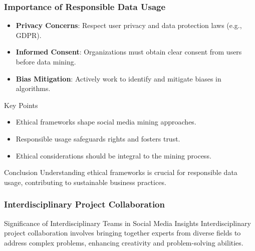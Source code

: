 \documentclass{beamer}
\begin{document}
\begin{frame}[fragile]
    \frametitle{Importance of Responsible Data Usage}
    \begin{itemize}
        \item \textbf{Privacy Concerns}: Respect user privacy and data protection laws (e.g., GDPR).
        \item \textbf{Informed Consent}: Organizations must obtain clear consent from users before data mining.
        \item \textbf{Bias Mitigation}: Actively work to identify and mitigate biases in algorithms.
    \end{itemize}

    \begin{block}{Key Points}
        \begin{itemize}
            \item Ethical frameworks shape social media mining approaches.
            \item Responsible usage safeguards rights and fosters trust.
            \item Ethical considerations should be integral to the mining process.
        \end{itemize}
    \end{block}

    \begin{block}{Conclusion}
        Understanding ethical frameworks is crucial for responsible data usage, contributing to sustainable business practices.
    \end{block}
\end{frame}

\begin{frame}[fragile]
    \frametitle{Interdisciplinary Project Collaboration}
    \begin{block}{Significance of Interdisciplinary Teams in Social Media Insights}
    Interdisciplinary project collaboration involves bringing together experts from diverse fields to address complex problems, enhancing creativity and problem-solving abilities.
    \end{block}
\end{frame}
\end{document}
